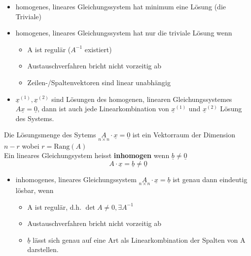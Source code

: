 \begin{itemize}
  \item homogenes, lineares Gleichungssystem hat minimum eine L\"osung (die Triviale)
  \item homogenes, lineares Gleichungssystem hat nur die triviale L\"osung wenn
	\begin{itemize}
	  \item A ist regul\"ar ($A^{-1}$ existiert)
	  \item Austauschverfahren bricht nicht vorzeitig ab
	  \item Zeilen-/Spaltenvektoren sind linear unabh\"angig
	\end{itemize}
  \item $\underline{x}^{(1)}, \underline{x}^{(2)}$ sind L\"osungen des
	homogenen, linearen Gleichungssystemes $A\underline{x}=\underline{0}$,
	dann ist auch jede Linearkombination von $\underline{x}^{(1)}$ und
	$\underline{x}^{(2)}$ L\"osung des Systems.
\end{itemize}
Die L\"osungsmenge des Sytems $\underset{n\times n}{A}\cdot\underline{x}=\underline{0}$ ist ein Vektorraum der Dimension $n-r$ wobei $r=\text{Rang}(A)$ \\
Ein lineares Gleichungsystem heisst \textbf{inhomogen} wenn $\underline{b}\neq\underline{0}$
\begin{equation*}
  A\cdot\underline{x} = \underline{b} \neq \underline{0}
\end{equation*}
\begin{itemize}
  \item inhomogenes, lineares Gleichungssystem $\underset{n\times n}{A}\cdot\underline{x}=\underline{b}$
	ist genau dann eindeutig l\"osbar, wenn
	\begin{itemize}
	  \item A ist regul\"ar, d.h. $\det{A}\neq 0, \exists A^{-1}$
	  \item Austauschverfahren bricht nicht vorzeitig ab
	  \item $\underline{b}$ l\"asst sich genau auf eine Art als
		Linearkombination der Spalten von A darstellen.
	\end{itemize}
\end{itemize}


